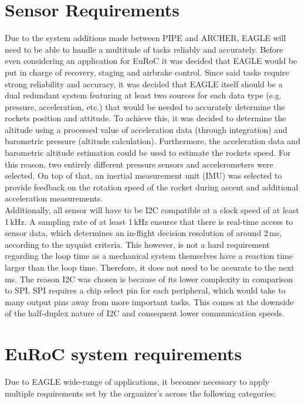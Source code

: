 \documentclass[fontsize=11pt,%
twoside,%
BCOR          = 8mm, %
DIV           = 11,  %
titlepage     = off,%
index=totoc,%
xcolor        = pdftex,%
dvipsnames,%
bibliography  = totoc,%
bibliography = numbered, %
listof        = notnumbered]{scrreprt}
\begin{document}
\section{Sensor Requirements}
Due to the system additions made between PIPE and ARCHER, EAGLE will need to be able to handle a multitude of tasks reliably and accurately. Before even considering an application for EuRoC it was decided that EAGLE would be put in charge of recovery, staging and airbrake control. Since said tasks require strong reliability and accuracy, it was decided that EAGLE itself should be a dual redundant system featuring at least two sources for each data type (e.g. pressure, acceleration, etc.) that would be needed to accurately determine the rockets position and attitude. To achieve this, it was decided to determine the altitude using a processed value of acceleration data (through integration) and barometric pressure (altitude calculation). Furthermore, the acceleration data and barometric altitude estimation could be used to estimate the rockets speed. For this reason, two entirely different pressure sensors and accelerometers were selected. On top of that, an inertial measurement unit (IMU) was selected to provide feedback on the rotation speed of the rocket during ascent and additional acceleration measurements.\\
Additionally, all sensor will have to be I2C compatible at a clock speed of at least 1\,kHz. A sampling rate of at least 1\,kHz ensures that there is real-time access to sensor data, which determines an in-flight decision resolution of around 2\,ms, according to the nyquist criteria. This however, is not a hard requirement regarding the loop time as a mechanical system themselves have a reaction time larger than the loop time. Therefore, it does not need to be accurate to the next ms. The reason I2C was chosen is because of its lower complexity in comparison to SPI. SPI requires a chip select pin for each peripheral, which would take to many output pins away from more important tasks. This comes at the downside of the half-duplex nature of I2C and consequent lower communication speeds.

\section{EuRoC system requirements} \label{sec:euroc_rules}
Due to EAGLE wide-range of applications, it becomes necessary to apply multiple requirements set by the organizer's across the following categories:
\end{document}
